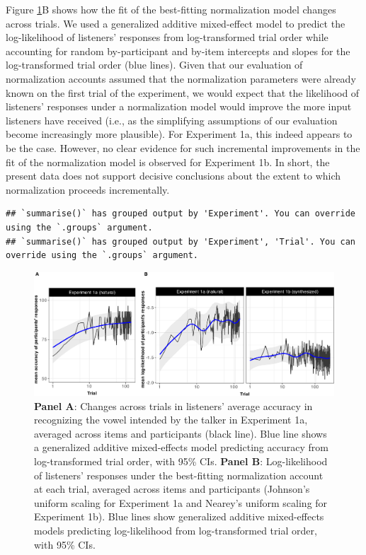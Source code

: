 \documentclass[preprint]{JASA}
\begin{document}
Figure \ref{fig:trial-accuracies}B shows how the fit of the best-fitting normalization model changes across trials. We used a generalized additive mixed-effect model to predict the log-likelihood of listeners' responses from log-transformed trial order while accounting for random by-participant and by-item intercepts and slopes for the log-transformed trial order (blue lines). Given that our evaluation of normalization accounts assumed that the normalization parameters were already known on the first trial of the experiment, we would expect that the likelihood of listeners' responses under a normalization model would improve the more input listeners have received (i.e., as the simplifying assumptions of our evaluation become increasingly more plausible). For Experiment 1a, this indeed appears to be the case. However, no clear evidence for such incremental improvements in the fit of the normalization model is observed for Experiment 1b. In short, the present data does not support decisive conclusions about the extent to which normalization proceeds incrementally.



\begin{verbatim}
## `summarise()` has grouped output by 'Experiment'. You can override using the `.groups` argument.
## `summarise()` has grouped output by 'Experiment', 'Trial'. You can override using the `.groups` argument.
\end{verbatim}

\begin{figure}[!ht]

{\centering \includegraphics[width=0.9\linewidth]{./Figure11} 

}

\caption{\textbf{Panel A}: Changes across trials in listeners' average accuracy in recognizing the vowel intended by the talker in Experiment 1a, averaged across items and participants (black line). Blue line shows a generalized additive mixed-effects model predicting accuracy from log-transformed trial order, with 95\% CIs. \textbf{Panel B}: Log-likelihood of listeners' responses under the best-fitting normalization account at each trial, averaged across items and participants (Johnson's uniform scaling for Experiment 1a and Nearey's uniform scaling for Experiment 1b). Blue lines show generalized additive mixed-effects models predicting log-likelihood from log-transformed trial order, with 95\% CIs.}\label{fig:trial-accuracies}
\end{figure}
\end{document}
